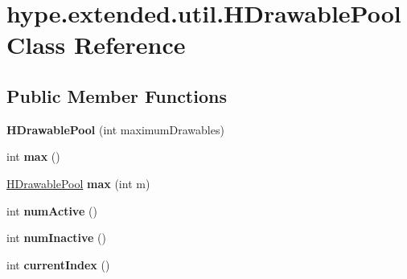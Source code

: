 \hypertarget{classhype_1_1extended_1_1util_1_1_h_drawable_pool}{\section{hype.\-extended.\-util.\-H\-Drawable\-Pool Class Reference}
\label{classhype_1_1extended_1_1util_1_1_h_drawable_pool}
}
\subsection*{Public Member Functions}
\begin{DoxyCompactItemize}
\item 
\hypertarget{classhype_1_1extended_1_1util_1_1_h_drawable_pool_aab1bf99f6f65dc10227744d450bb7b3d}{{\bfseries H\-Drawable\-Pool} (int maximum\-Drawables)}\label{classhype_1_1extended_1_1util_1_1_h_drawable_pool_aab1bf99f6f65dc10227744d450bb7b3d}

\item 
\hypertarget{classhype_1_1extended_1_1util_1_1_h_drawable_pool_ab03cdf40a3f7b6f026a7be795fc7e0fe}{int {\bfseries max} ()}\label{classhype_1_1extended_1_1util_1_1_h_drawable_pool_ab03cdf40a3f7b6f026a7be795fc7e0fe}

\item 
\hypertarget{classhype_1_1extended_1_1util_1_1_h_drawable_pool_a7ff023b3380dabf07b954406279bb46f}{\hyperlink{classhype_1_1extended_1_1util_1_1_h_drawable_pool}{H\-Drawable\-Pool} {\bfseries max} (int m)}\label{classhype_1_1extended_1_1util_1_1_h_drawable_pool_a7ff023b3380dabf07b954406279bb46f}

\item 
\hypertarget{classhype_1_1extended_1_1util_1_1_h_drawable_pool_a9375a8e3baaaf4770bfc772d2c229acf}{int {\bfseries num\-Active} ()}\label{classhype_1_1extended_1_1util_1_1_h_drawable_pool_a9375a8e3baaaf4770bfc772d2c229acf}

\item 
\hypertarget{classhype_1_1extended_1_1util_1_1_h_drawable_pool_a9358bff53a8161a9d783a5d7e067d913}{int {\bfseries num\-Inactive} ()}\label{classhype_1_1extended_1_1util_1_1_h_drawable_pool_a9358bff53a8161a9d783a5d7e067d913}

\item 
\hypertarget{classhype_1_1extended_1_1util_1_1_h_drawable_pool_a91ad7ff61432a1d8d0f876de7c7529c7}{int {\bfseries current\-Index} ()}\label{classhype_1_1extended_1_1util_1_1_h_drawable_pool_a91ad7ff61432a1d8d0f876de7c7529c7}


\end{DoxyCompactItemize}

